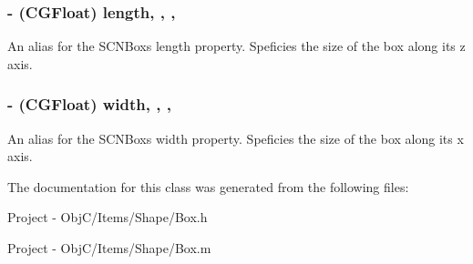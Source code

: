 \subsubsection[{length}]{\setlength{\rightskip}{0pt plus 5cm}-\/ (C\+G\+Float) length\hspace{0.3cm}{\ttfamily [read]}, {\ttfamily [write]}, {\ttfamily [nonatomic]}, {\ttfamily [assign]}}\label{interface_box_a2c7eae6cda0de5f55b0b25fce41d12c5}
An alias for the S\+C\+N\+Box\textquotesingle{}s {\ttfamily length} property. Speficies the size of the box along its {\ttfamily z} axis. \hypertarget{interface_box_afc93a48f771956f78dbd30a81e04d295}{}
\subsubsection[{width}]{\setlength{\rightskip}{0pt plus 5cm}-\/ (C\+G\+Float) width\hspace{0.3cm}{\ttfamily [read]}, {\ttfamily [write]}, {\ttfamily [nonatomic]}, {\ttfamily [assign]}}\label{interface_box_afc93a48f771956f78dbd30a81e04d295}
An alias for the S\+C\+N\+Box\textquotesingle{}s {\ttfamily width} property. Speficies the size of the box along its {\ttfamily x} axis. 

The documentation for this class was generated from the following files\+:\begin{DoxyCompactItemize}
\item 
Project -\/ Obj\+C/\+Items/\+Shape/Box.\+h\item 
Project -\/ Obj\+C/\+Items/\+Shape/Box.\+m\end{DoxyCompactItemize}

